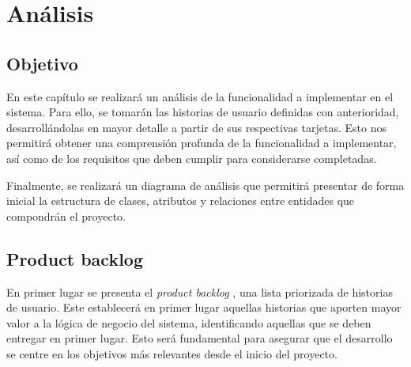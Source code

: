 \chapter{Análisis} \label{análisis}

\section{Objetivo}
En este capítulo se realizará un análisis de la funcionalidad a implementar en el sistema. Para ello, se tomarán las  historias de usuario definidas con anterioridad, desarrollándolas en mayor detalle a partir de sus respectivas tarjetas. Esto nos permitirá obtener una comprensión profunda de la funcionalidad a implementar, así como de los requisitos que deben cumplir para considerarse completadas.

Finalmente, se realizará un diagrama de análisis que permitirá presentar de forma inicial la estructura de clases, atributos y relaciones entre entidades que compondrán el proyecto.



\section{Product backlog}
En primer lugar se presenta el \textit{product backlog} \cite{atlassianBacklog}, una lista priorizada de historias de usuario. Este establecerá en primer lugar aquellas historias que aporten mayor valor a la lógica de negocio del sistema, identificando aquellas que se deben entregar en primer lugar. Esto será fundamental para asegurar que el desarrollo se centre en los objetivos más relevantes desde el inicio del proyecto.


